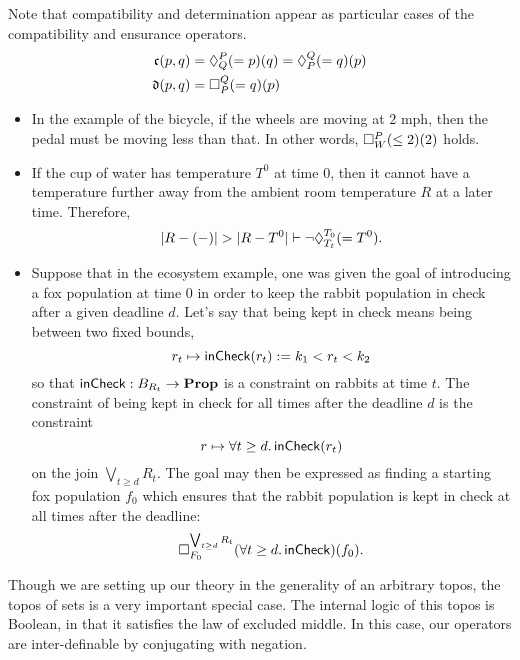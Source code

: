     Note that compatibility and determination appear as particular cases of the compatibility and ensurance operators.
    \begin{align*}
        \mathfrak{c}(p, q) &= \compat{P}{Q}(=p)(q) = \compat{Q}{P}(=q)(p) \\
        \mathfrak{d}(p, q) &= \ensure{Q}{P}(=q)(p)
    \end{align*}
    
    \begin{ex}
    \begin{itemize}
        \item In the example of the bicycle, if the wheels are moving at $2$ mph, then the pedal must be moving less than that. In other words, $\ensure{P}{W}(\leq 2)(2)$ holds.
        
        \item If the cup of water has temperature $T^0$ at time $0$, then it cannot have a temperature further away from the ambient room temperature $R$ at a later time. Therefore, 
        $$|R - (-)| > |R - T^0| \vdash \neg \compat{T_0}{T_t}(=T^0).$$
        
        \item Suppose that in the ecosystem example, one was given the goal of introducing a fox population at time $0$ in order to keep the rabbit population in check after a given deadline $d$. Let's say that being kept in check means being between two fixed bounds, $$r_t \mapsto \term{inCheck}(r_t) := k_1 < r_t < k_2$$
        so that $\term{inCheck} : B_{R_t} \to \Prop$ is a constraint on rabbits at time $t$. The constraint of being kept in check for all times after the deadline $d$ is the constraint
        $$r \mapsto \forall t \geq d.\, \term{inCheck}(r_t)$$
        on the join $\bigvee_{t \geq d} R_t$. The goal may then be expressed as finding a starting fox population $f_0$ which ensures that the rabbit population is kept in check at all times after the deadline:
        $$\ensure{\bigvee_{t \geq d} R_t}{F_0}(\forall t \geq d.\, \term{inCheck})(f_0).$$   
        \end{itemize}
 \end{ex}
 
    Though we are setting up our theory in the generality of an arbitrary topos, the topos of sets is a very important special case. The internal logic of this topos is Boolean, in that it satisfies the law of excluded middle. In this case, our operators are inter-definable by conjugating with negation.
    

